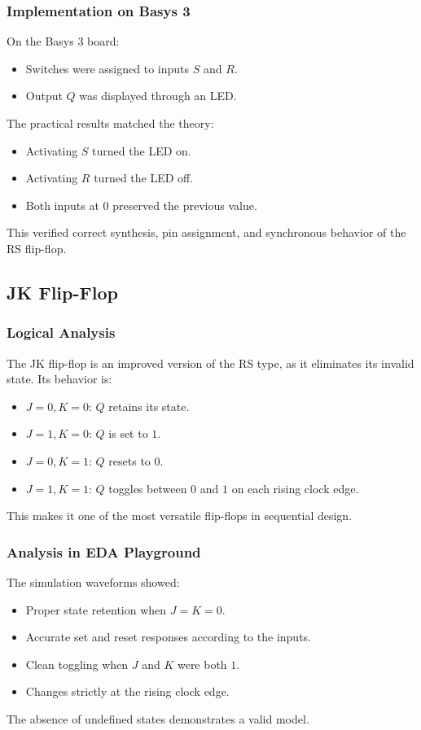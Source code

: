 \documentclass[12pt]{article}  %
\begin{document}
\subsubsection{Implementation on Basys 3}
On the Basys 3 board:
\begin{itemize}
    \item Switches were assigned to inputs $S$ and $R$.
    \item Output $Q$ was displayed through an LED.
\end{itemize}
The practical results matched the theory:
\begin{itemize}
    \item Activating $S$ turned the LED on.
    \item Activating $R$ turned the LED off.
    \item Both inputs at $0$ preserved the previous value.
\end{itemize}
This verified correct synthesis, pin assignment, and synchronous behavior of the RS flip-flop.

\subsection{JK Flip-Flop}

\subsubsection{Logical Analysis}
The JK flip-flop is an improved version of the RS type, as it eliminates its invalid state. Its behavior is:
\begin{itemize}
    \item $J = 0, K = 0$: $Q$ retains its state.
    \item $J = 1, K = 0$: $Q$ is set to $1$.
    \item $J = 0, K = 1$: $Q$ resets to $0$.
    \item $J = 1, K = 1$: $Q$ toggles between $0$ and $1$ on each rising clock edge.
\end{itemize}
This makes it one of the most versatile flip-flops in sequential design.

\subsubsection{Analysis in EDA Playground}
The simulation waveforms showed:
\begin{itemize}
    \item Proper state retention when $J = K = 0$.
    \item Accurate set and reset responses according to the inputs.
    \item Clean toggling when $J$ and $K$ were both $1$.
    \item Changes strictly at the rising clock edge.
\end{itemize}
The absence of undefined states demonstrates a valid model.
\end{document}

